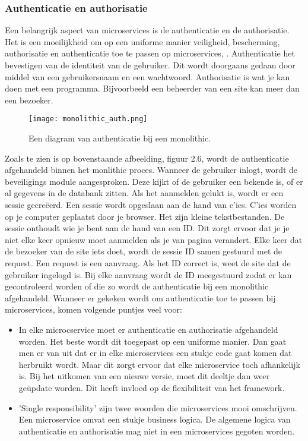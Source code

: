 \subsubsection{Authenticatie en authorisatie}
Een belangrijk aspect van microservices is de authenticatie en de authorisatie.  Het is een moeilijkheid om op een uniforme manier veiligheid, bescherming, authorisatie en authenticatie toe te passen op microservices, \textcite{Ayoub2018}. Authenticatie het bevestigen van de identiteit van de gebruiker. Dit wordt doorgaans gedaan door middel van een gebruikersnaam en een wachtwoord. Authorisatie is wat je kan doen met een programma. Bijvoorbeeld een beheerder van een site kan meer dan een bezoeker. 
\begin{figure}[h]
	\texttt{[image: monolithic\_auth.png]}
	\centering
	\caption{Een diagram van authenticatie bij een monolithic. \textcite{Ayoub2018}}
\end{figure}
Zoals te zien is op bovenstaande afbeelding, figuur 2.6, wordt de authenticatie afgehandeld binnen het monlithic proces. Wanneer de gebruiker inlogt, wordt de beveiligings module aangesproken. Deze kijkt of de gebruiker een bekende is, of er al gegevens in de databank zitten. Als het aanmelden gelukt is, wordt er een sessie gecreëerd. Een sessie wordt opgeslaan aan de hand van c'ies. C'ies worden op je computer geplaatst door je browser. Het zijn kleine tekstbestanden. De sessie onthoudt wie je bent aan de hand van een ID. Dit zorgt ervoor dat je je niet elke keer opnieuw moet aanmelden als je van pagina verandert.  Elke keer dat de bezoeker van de site iets doet, wordt de sessie ID samen gestuurd met de request. Een request is een aanvraag. Als het ID correct is,  weet de site dat de gebruiker ingelogd is. Bij elke aanvraag wordt de ID meegestuurd zodat er kan gecontroleerd worden of die zo wordt de authenticatie bij een monolithic afgehandeld.
Wanneer er gekeken wordt om authenticatie toe te passen bij microservices, komen volgende puntjes veel voor:
\begin{itemize}
	\item In elke microcservice moet er authenticatie en authorisatie afgehandeld worden. Het beste wordt dit toegepast op een uniforme manier. Dan gaat men er van uit dat er in elke microservices een stukje code gaat komen dat herbruikt wordt. Maar dit zorgt ervoor dat elke microservice toch afhankelijk is. Bij het uitkomen van een nieuwe  versie, moet dit deeltje dan  weer geüpdate worden. Dit heeft invloed op de flexibiliteit van het framework.
	\item 'Single responsibility' zijn twee woorden die microservices mooi omschrijven. Een microservice omvat een stukje business logica. De algemene logica van authenticatie en authorisatie mag niet in een microservices gegoten worden. 
\end{itemize}
